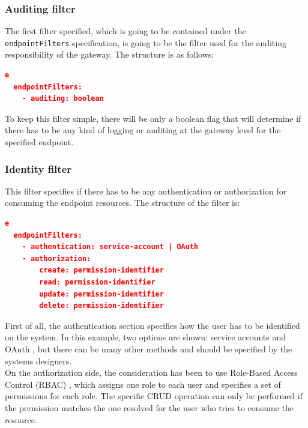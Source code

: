 \documentclass[english, 12pt, a4paper, sci, utf8, a-1b, online]{aaltothesis}
\begin{document}
\subsubsection*{Auditing filter}

The first filter specified, which is going to be contained under the \texttt{endpointFilters} specification, is going to be the filter used for the auditing responsibility of the gateway. The structure is as follows:\\

\begin{lstlisting}[language=json,firstnumber=1]e
  endpointFilters:
    - auditing: boolean
\end{lstlisting}

To keep this filter simple, there will be only a boolean flag that will determine if there has to be any kind of logging or auditing at the gateway level for the specified endpoint.

\subsubsection*{Identity filter}

This filter specifies if there has to be any authentication or authorization for consuming the endpoint resources. The structure of the filter is:\\

\begin{lstlisting}[language=json,firstnumber=1]e
  endpointFilters:
    - authentication: service-account | OAuth
    - authorization:
	    create: permission-identifier
	    read: permission-identifier
	    update: permission-identifier
	    delete: permission-identifier
\end{lstlisting}

First of all, the authentication section specifies how the user has to be identified on the system. In this example, two options are shown: service accounts and OAuth \cite{OAuth2}, but there can be many other methods and should be specified by the systems designers.\\

On the authorization side, the consideration has been to use Role-Based Access Control (RBAC) \cite{ferraiolo2003role}, which assigns one role to each user and specifies a set of permissions for each role. The specific CRUD operation can only be performed if the permission matches the one resolved for the user who tries to consume the resource.
\end{document}
